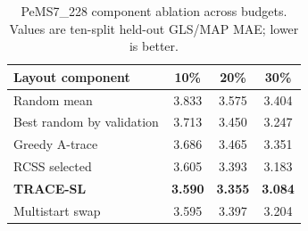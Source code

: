 \begin{table}[pos=htbp]
\centering
\caption{PeMS7\_228 component ablation across budgets. Values are ten-split held-out GLS/MAP MAE; lower is better.}
\label{tab:ablation}
\small
\setlength{\tabcolsep}{4pt}
\begin{tabular}{lccc}
\toprule
Layout component & 10\% & 20\% & 30\% \\
\midrule
Random mean & 3.833 & 3.575 & 3.404 \\
Best random by validation & 3.713 & 3.450 & 3.247 \\
Greedy A-trace & 3.686 & 3.465 & 3.351 \\
RCSS selected & 3.605 & 3.393 & 3.183 \\
\textbf{TRACE-SL} & \textbf{3.590} & \textbf{3.355} & \textbf{3.084} \\
Multistart swap & 3.595 & 3.397 & 3.204 \\
\bottomrule
\end{tabular}
\end{table}
